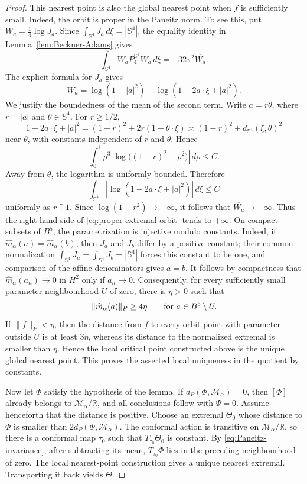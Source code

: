 \documentclass[11pt]{article}
\numberwithin{equation}{section}
\begin{document}
\begin{proof}
This nearest point is also the global nearest point when \(f\) is sufficiently
small. Indeed, the orbit is proper in the Paneitz norm. To see this, put
\(W_a=\frac14\log J_a\). Since \(\int_{\mathbb S^{4}}J_a\,d\xi=|\mathbb S^{4}|\),
the equality identity in Lemma~\ref{lem:Beckner-Adams} gives
\begin{equation}\label{eq:proper-extremal-orbit}
\int_{\mathbb S^{4}}W_aP_{4}^{\mathbb S^{4}}W_a\,d\xi
=-32\pi^{2}\overline{W_a}.
\end{equation}
The explicit formula for \(J_a\) gives
\[
W_a=\log(1-|a|^{2})-\log(1-2a\cdot\xi+|a|^{2}).
\]
We justify the boundedness of the mean of the second term. Write
\(a=r\theta\), where \(r=|a|\) and \(\theta\in\mathbb S^{4}\). For
\(r\geq1/2\),
\[
1-2a\cdot\xi+|a|^{2}
=(1-r)^{2}+2r(1-\theta\cdot\xi)
\asymp (1-r)^{2}+d_{\mathbb S^{4}}(\xi,\theta)^{2}
\]
near \(\theta\), with constants independent of \(r\) and \(\theta\). Hence
\[
\int_{0}^{1}\rho^{3}
\left|\log\bigl((1-r)^{2}+\rho^{2}\bigr)\right|\,d\rho\leq C.
\]
Away from \(\theta\), the logarithm is uniformly bounded. Therefore
\[
\int_{\mathbb S^{4}}
\left|\log(1-2a\cdot\xi+|a|^{2})\right|\,d\xi\leq C
\]
uniformly as \(r\uparrow1\). Since \(\log(1-r^{2})\to-\infty\), it follows
that \(\overline{W_a}\to-\infty\). Thus the right-hand side of
\eqref{eq:proper-extremal-orbit} tends to \(+\infty\). On compact subsets of
\(B^{5}\), the parametrization is injective modulo constants. Indeed, if
\(\widehat m_\alpha(a)=\widehat m_\alpha(b)\), then \(J_a\) and \(J_b\) differ
by a positive constant; their common normalization
\(\int_{\mathbb S^4}J_a=\int_{\mathbb S^4}J_b=|\mathbb S^4|\) forces this
constant to be one, and comparison of the affine denominators gives \(a=b\).
It follows by compactness that
\(\widehat m_{\alpha}(a_n)\to0\) in \(H^{2}\) only if \(a_n\to0\).
Consequently, for every sufficiently small parameter neighbourhood
\(U\) of zero, there is \(\eta>0\) such that
\[
\|\widehat m_\alpha(a)\|_P\geq4\eta
\qquad\hbox{for }a\in B^5\setminus U.
\]
If \(\|f\|_P<\eta\), then the distance from \(f\) to every orbit point
with parameter outside \(U\) is at least \(3\eta\), whereas its distance
to the normalized extremal is smaller than \(\eta\). Hence the local
critical point constructed above is the unique global nearest point. This
proves the asserted local uniqueness in the quotient by constants.

Now let \(\Phi\) satisfy the hypothesis of the lemma. If
\(d_P(\Phi,\mathcal M_\alpha)=0\), then \([\Phi]\) already belongs to
\(\mathcal M_\alpha/\mathbb R\), and all conclusions follow with
\(\Psi=0\). Assume henceforth that the distance is positive. Choose an
extremal \(\Theta_{0}\) whose distance to \(\Phi\) is smaller than
\(2d_P(\Phi,\mathcal M_\alpha)\). The conformal action is transitive on
\(\mathcal M_{\alpha}/\mathbb R\), so there is a conformal map \(\tau_0\) such
that \(T_{\tau_0}\Theta_0\) is constant. By \eqref{eq:Paneitz-invariance}, after
subtracting its mean, \(T_{\tau_0}\Phi\) lies in the preceding neighbourhood of
zero. The local nearest-point construction gives a unique nearest extremal.
Transporting it back yields \(\Theta\).


\end{proof}
\end{document}
